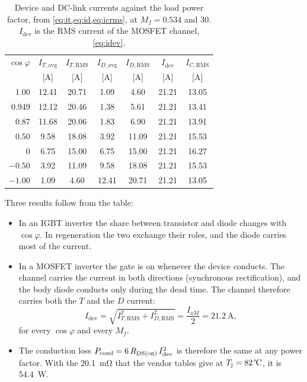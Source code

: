 \begin{table}[H]
\centering
\caption{Device and DC-link currents against the load power factor, from
\cref{eq:it,eq:id,eq:icrms}, at $M_f = 0.534$ and \SI{30}{\Arms}. $I_\mathrm{dev}$
is the RMS current of the MOSFET channel, \cref{eq:idev}.}
\label{tab:pfcurrents}
\zebra[3]
\begin{tabular}{rcccccc}
\toprule
$\cos\varphi$ & $I_{T,\mathrm{avg}}$ & $I_{T,\mathrm{RMS}}$ & $I_{D,\mathrm{avg}}$ & $I_{D,\mathrm{RMS}}$ & $I_\mathrm{dev}$ & $I_{C,\mathrm{RMS}}$ \\
 & [\si{\ampere}] & [\si{\ampere}] & [\si{\ampere}] & [\si{\ampere}] & [\si{\ampere}] & [\si{\ampere}] \\
\midrule
1.00  & 12.41 & 20.71 & 1.09  & 4.60  & 21.21 & 13.05 \\
0.949 & 12.12 & 20.46 & 1.38  & 5.61  & 21.21 & 13.41 \\
0.87  & 11.68 & 20.06 & 1.83  & 6.90  & 21.21 & 13.91 \\
0.50  & 9.58  & 18.08 & 3.92  & 11.09 & 21.21 & 15.53 \\
0     & 6.75  & 15.00 & 6.75  & 15.00 & 21.21 & 16.27 \\
$-0.50$ & 3.92  & 11.09 & 9.58  & 18.08 & 21.21 & 15.53 \\
$-1.00$ & 1.09  & 4.60  & 12.41 & 20.71 & 21.21 & 13.05 \\
\bottomrule
\end{tabular}
\end{table}

Three results follow from the table:
\begin{itemize}
  \item In an IGBT inverter the share between transistor and diode changes
        with $\cos\varphi$. In regeneration the two exchange their roles,
        and the diode carries most of the current.
  \item In a MOSFET inverter the gate is on whenever the device conducts.
        The channel carries the current in both directions (synchronous
        rectification), and the body diode conducts only during the dead
        time. The channel therefore carries both the $T$ and the $D$
        current:
        \begin{equation}
          I_\mathrm{dev} = \sqrt{I_{T,\mathrm{RMS}}^2 + I_{D,\mathrm{RMS}}^2}
          = \frac{I_{oM}}{2} = \SI{21.2}{\ampere} ,
          \label{eq:idev}
        \end{equation}
        for every $\cos\varphi$ and every $M_f$.
  \item The conduction loss $P_\mathrm{cond} = 6\,R_{\mathrm{DS(on)}}\,I_\mathrm{dev}^2$
        is therefore the same at any power factor. With the
        \SI{20.1}{\milli\ohm} that the vendor tables give at
        $\Tj = \SI{82}{\celsius}$, it is \SI{54.4}{\watt}.
\end{itemize}

